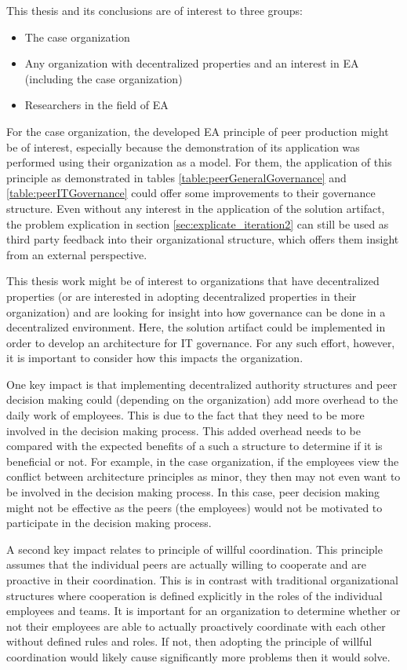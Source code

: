 This thesis and its conclusions are of interest to three groups:
\begin{itemize}
\item The case organization
\item Any organization with decentralized properties and an interest in EA (including the case organization)
\item Researchers in the field of EA
\end{itemize}

For the case organization, the developed EA principle of peer production might be of interest, especially because the demonstration of its application was performed using their organization as a model. For them, the application of this principle as demonstrated in tables \ref{table:peerGeneralGovernance} and \ref{table:peerITGovernance} could offer some improvements to their governance structure. Even without any interest in the application of the solution artifact, the problem explication in section \ref{sec:explicate_iteration2} can still be used as third party feedback into their organizational structure, which offers them insight from an external perspective.

This thesis work might be of interest to organizations that have decentralized properties (or are interested in adopting decentralized properties in their organization) and are looking for insight into how governance can be done in a decentralized environment. Here, the solution artifact could be implemented in order to develop an architecture for IT governance. For any such effort, however, it is important to consider how this impacts the organization.

One key impact is that implementing decentralized authority structures and peer decision making could (depending on the organization) add more overhead to the daily work of employees. This is due to the fact that they need to be more involved in the decision making process. This added overhead needs to be compared with the expected benefits of a such a structure to determine if it is beneficial or not. For example, in the case organization, if the employees view the conflict between architecture principles as minor, they then may not even want to be involved in the decision making process. In this case, peer decision making might not be effective as the peers (the employees) would not be motivated to participate in the decision making process. 

A second key impact relates to principle of willful coordination. This principle assumes that the individual peers are actually willing to cooperate and are proactive in their coordination. This is in contrast with traditional organizational structures where cooperation is defined explicitly in the roles of the individual employees and teams. It is important for an organization to determine whether or not their employees are able to actually proactively coordinate with each other without defined rules and roles. If not, then adopting the principle of willful coordination would likely cause significantly more problems then it would solve.  

